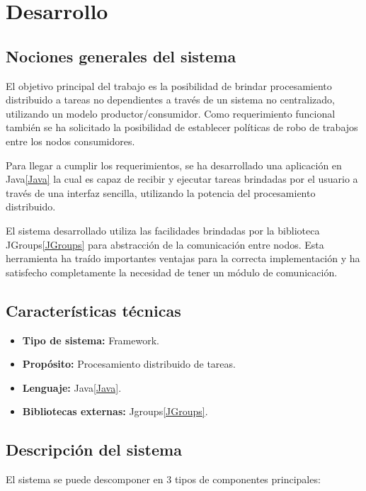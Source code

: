 \documentclass[12pt,a4paper,oneside,spanish]{report}
\begin{document}
\section*{Desarrollo}

\subsection*{Nociones generales del sistema}

El objetivo principal del trabajo es la posibilidad de brindar procesamiento distribuido a tareas no dependientes a través de un sistema no centralizado, utilizando un modelo productor/consumidor. Como requerimiento funcional también se ha solicitado la posibilidad de establecer políticas de robo de trabajos entre los nodos consumidores.

Para llegar a cumplir los requerimientos, se ha desarrollado una aplicación en Java\ref{Java} la cual es capaz de recibir y ejecutar tareas brindadas por el usuario a través de una interfaz sencilla, utilizando la potencia del procesamiento distribuido.

El sistema desarrollado utiliza las facilidades brindadas por la biblioteca JGroups\ref{JGroups} para abstracción de la comunicación entre nodos. Esta herramienta ha traído importantes ventajas para la correcta implementación y ha satisfecho completamente la necesidad de tener un módulo de comunicación.

\subsection*{Características técnicas}

\begin{itemize}
	\item \textbf{Tipo de sistema:} Framework.
	\item \textbf{Propósito:} Procesamiento distribuido de tareas.
    \item \textbf{Lenguaje:} Java\ref{Java}.
    	\item \textbf{Bibliotecas externas:} Jgroups\ref{JGroups}.
\end{itemize}

\subsection*{Descripción del sistema}

El sistema se puede descomponer en 3 tipos de componentes principales:
\end{document}
